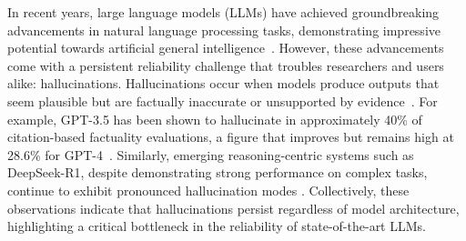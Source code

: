 \documentclass[dvipsnames]{article}
\begin{document}

In recent years, large language models (LLMs) have achieved groundbreaking advancements in natural language processing tasks, demonstrating impressive potential towards artificial general intelligence~\citep{foundation-model,gpt3,instruct-gpt,gpt4}. However, these advancements come with a persistent reliability challenge that troubles researchers and users alike: hallucinations. Hallucinations occur when models produce outputs that seem plausible but are factually inaccurate or unsupported by evidence~\citep{OnFaithfulnessandFactuality,hallusurvey}. For example, GPT-3.5 has been shown to hallucinate in approximately 40\% of citation-based factuality evaluations, a figure that improves but remains high at 28.6\% for GPT-4~\citep{Hallucination_Rates}. Similarly,  emerging reasoning-centric systems such as DeepSeek-R1, despite demonstrating strong performance on complex tasks, continue to exhibit pronounced hallucination modes \citep{vectara_deepseek_r1_hallucination}. Collectively, these observations indicate that hallucinations persist regardless of model architecture, highlighting a critical bottleneck in the reliability of state-of-the-art LLMs.

\end{document}

